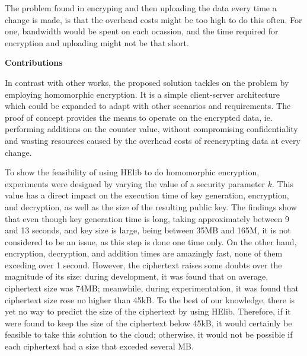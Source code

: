 The problem found in encryping and then uploading the data every time a change is made, is that the overhead costs might be too high to do this often. For one, bandwidth would be spent on each ocassion, and the time required for encryption and uploading might not be that short. 

\textbf{Contributions}

In contrast with other works, the proposed solution tackles on the problem by employing homomorphic encryption. It is a simple client-server architecture which could be expanded to adapt with other scenarios and requirements. The proof of concept provides the means to operate on the encrypted data, ie. performing additions on the counter value, without compromising confidentiality and wasting resources caused by the overhead costs of reencrypting data at every change.


To show the feasibility of using HElib to do homomorphic encryption, experiments were designed by varying the value of a security parameter $k$. This value has a direct impact on the execution time of key generation, encryption, and decryption, as well as the size of the resulting public key. The findings show that even though key generation time is long, taking approximately between 9 and 13 seconds, and key size is large, being between 35MB and 165M, it is not considered to be an issue, as this step is done one time only. On the other hand, encryption, decryption, and addition times are amazingly fast, none of them exceding over 1 second. However, the ciphertext raises some doubts over the magnitude of its size: during development, it was found that on average, ciphertext size was 74MB; meanwhile, during experimentation, it was found that ciphertext size rose no higher than 45kB. To the best of our knowledge, there is yet no way to predict the size of the ciphertext by using HElib. Therefore, if it were found to keep the size of the ciphertext below 45kB, it would certainly be feasible to take this solution to the cloud; otherwise, it would not be possible if each ciphertext had a size that exceded several MB.

\clearpage
